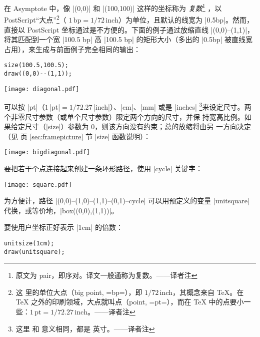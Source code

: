 \documentclass[nofonts,CJKnormalspaces]{ctexbook}[2009/05/20]
\newcommand*\prgname[1]{\textsf{#1}}
\newcommand\transnote[1]{\footnote{#1——译者注}}
\begin{document}
在 \prgname{Asymptote} 中，像 |(0,0)| 和 |(100,100)| 这样的坐标称为%
\emph{复数}\transnote{原文为 pair，即序对。译文一般通称为复数。}%
，以 \prgname{PostScript}“大点”\transnote{这
里的单位大点（big point, \inlinecode=bp=），即 $1/72$\,inch，其概念来自
\TeX{}。在 \TeX{} 之外的印刷领域，大点就叫点（point, \inlinecode=pt=），而在
\TeX{} 中的点要小一些：$1\,\text{pt} = 1/72.27\,\text{inch}$。}（
$1\,\text{bp} = 1/72\,\text{inch}$）为单位，且默认的线宽为 |0.5bp|。然而，
直接以 \prgname{PostScript} 坐标通过是不方便的。下面的例子通过放缩直线
|(0,0)--(1,1)|，将其匹配到一个宽 |100.5 bp| 高 |100.5 bp| 的矩形大小（多出的
|0.5bp| 被直线宽占用），来生成与前面例子完全相同的输出：
\begin{lstlisting}
size(100.5,100.5);
draw((0,0)--(1,1));
\end{lstlisting}
\begin{center}
  \texttt{[image: diagonal.pdf]}
\end{center}

可以按 |pt|（$1$\,|pt|${}=1/72.27$\,|inch|）、|cm|、|mm| 或是 |inches|%
\transnote{这里  和  意义相同，都是
英寸。}来设定尺寸。两个非零尺寸参数（或单个尺寸参数）限定两个方向的尺寸，并保
持宽高比例。如果给定尺寸（|size|）参数为 0，则该方向没有约束；总的放缩将由另
一方向决定（见 \pageref{sec:framepicture} 页 \ref{sec:framepicture} 节 |size|
函数说明）：

\begin{center}
  \texttt{[image: bigdiagonal.pdf]}
\end{center}

要把若干个点连接起来创建一条环形路径，使用 |cycle| 关键字：

\begin{center}
  \texttt{[image: square.pdf]}
\end{center}
为方便计，路径 |(0,0)--(1,0)--(1,1)--(0,1)--cycle| 可以用预定义的变量
|unitsquare| 代换，或等价地，|box((0,0),(1,1))|。

要使用户坐标正好表示 |1cm| 的倍数：
\begin{lstlisting}
unitsize(1cm);
draw(unitsquare);
\end{lstlisting}
\end{document}
